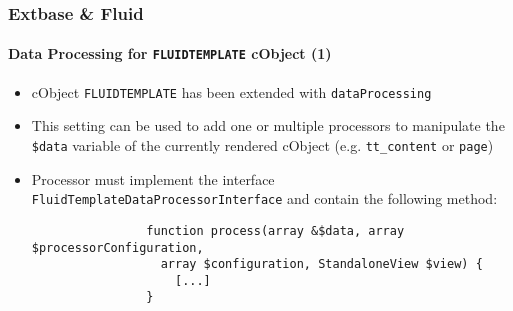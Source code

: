 \begin{frame}[fragile]
	\frametitle{Extbase \& Fluid}
	\framesubtitle{Data Processing for \texttt{FLUIDTEMPLATE} cObject (1)}

	\lstset{basicstyle=\smaller\ttfamily}

	\begin{itemize}

		\item cObject \texttt{FLUIDTEMPLATE} has been extended with \texttt{dataProcessing}

		\item This setting can be used to add one or multiple processors to
			manipulate the \texttt{\$data} variable of the currently rendered cObject\newline
			(e.g. \texttt{tt\_content} or \texttt{page})

		\item Processor must implement the interface
			\texttt{FluidTemplateDataProcessorInterface} and contain the following method:

			\begin{lstlisting}
				function process(array &$data, array $processorConfiguration,
				  array $configuration, StandaloneView $view) {
				    [...]
				}
			\end{lstlisting}

	\end{itemize}

\end{frame}


